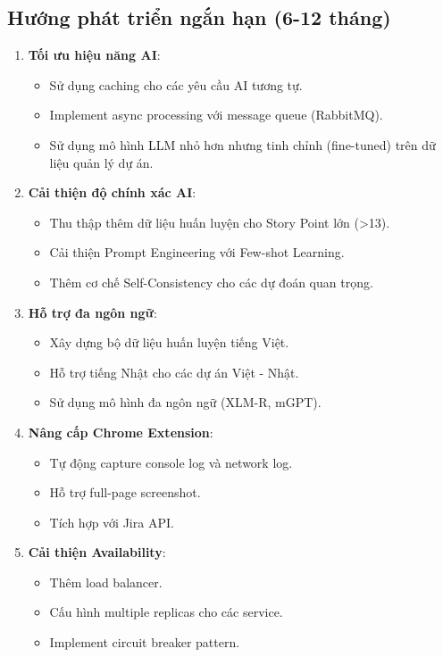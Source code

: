 \documentclass[12pt,a4paper]{report}
\begin{document}
\subsection{Hướng phát triển ngắn hạn (6-12 tháng)}

\begin{enumerate}
\item \textbf{Tối ưu hiệu năng AI}:
\begin{itemize}
\item Sử dụng caching cho các yêu cầu AI tương tự.
\item Implement async processing với message queue (RabbitMQ).
\item Sử dụng mô hình LLM nhỏ hơn nhưng tinh chỉnh (fine-tuned) trên dữ liệu quản lý dự án.
\end{itemize}

\item \textbf{Cải thiện độ chính xác AI}:
\begin{itemize}
\item Thu thập thêm dữ liệu huấn luyện cho Story Point lớn (>13).
\item Cải thiện Prompt Engineering với Few-shot Learning.
\item Thêm cơ chế Self-Consistency cho các dự đoán quan trọng.
\end{itemize}

\item \textbf{Hỗ trợ đa ngôn ngữ}:
\begin{itemize}
\item Xây dựng bộ dữ liệu huấn luyện tiếng Việt.
\item Hỗ trợ tiếng Nhật cho các dự án Việt - Nhật.
\item Sử dụng mô hình đa ngôn ngữ (XLM-R, mGPT).
\end{itemize}

\item \textbf{Nâng cấp Chrome Extension}:
\begin{itemize}
\item Tự động capture console log và network log.
\item Hỗ trợ full-page screenshot.
\item Tích hợp với Jira API.
\end{itemize}

\item \textbf{Cải thiện Availability}:
\begin{itemize}
\item Thêm load balancer.
\item Cấu hình multiple replicas cho các service.
\item Implement circuit breaker pattern.
\end{itemize}
\end{enumerate}
\end{document}
